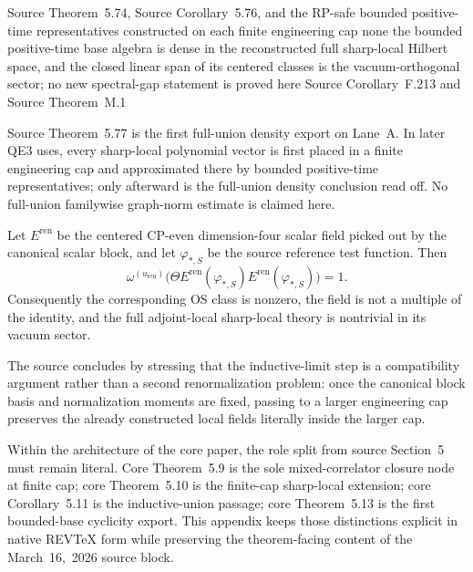 \dependencyledger
  {Source Theorem~5.74, Source Corollary~5.76, and the RP-safe bounded positive-time representatives constructed on each finite engineering cap}
  {none}
  {the bounded positive-time base algebra is dense in the reconstructed full sharp-local Hilbert space, and the closed linear span of its centered classes is the vacuum-orthogonal sector; no new spectral-gap statement is proved here}
  {Source Corollary~F.213 and Source Theorem~M.1}

\begin{remark}
Source Theorem~5.77 is the first full-union density export on Lane~A. In later QE3 uses, every sharp-local polynomial vector is first placed in a finite engineering cap and approximated there by bounded positive-time representatives; only afterward is the full-union density conclusion read off. No full-union familywise graph-norm estimate is claimed here.
\end{remark}

\begin{theorem}
Let $E^{\mathrm{ren}}$ be the centered CP-even dimension-four scalar field picked out by the canonical scalar block, and let $\varphi_{\ast,S}$ be the source reference test function. Then
\[
\omega^{(u_{\mathrm{ren}})}\bigl(\Theta E^{\mathrm{ren}}(\varphi_{\ast,S})E^{\mathrm{ren}}(\varphi_{\ast,S})\bigr)=1.
\]
Consequently the corresponding OS class is nonzero, the field is not a multiple of the identity, and the full adjoint-local sharp-local theory is nontrivial in its vacuum sector.
\end{theorem}

The source concludes by stressing that the inductive-limit step is a compatibility argument rather than a second renormalization problem: once the canonical block basis and normalization moments are fixed, passing to a larger engineering cap preserves the already constructed local fields literally inside the larger cap.

\begin{remark}
Within the architecture of the core paper, the role split from source Section~5 must remain literal. Core Theorem~5.9 is the sole mixed-correlator closure node at finite cap; core Theorem~5.10 is the finite-cap sharp-local extension; core Corollary~5.11 is the inductive-union passage; core Theorem~5.13 is the first bounded-base cyclicity export. This appendix keeps those distinctions explicit in native REV\TeX{} form while preserving the theorem-facing content of the March~16,~2026 source block.
\end{remark}
